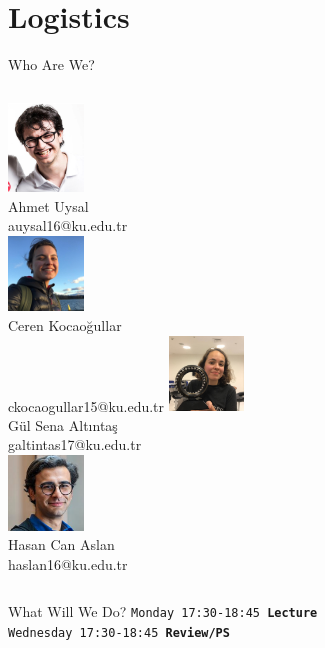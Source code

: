 	\section{Logistics}
		\begin{frame}{Who Are We?}
			\begin{columns}
				\column{5cm}
				\centering 
					\includegraphics[width=2.0cm]{images/ahmet.png}\\
					Ahmet Uysal\\
					auysal16@ku.edu.tr\\
					\pause
					\includegraphics[width=2.0cm]{images/ceren.jpg}\\
					Ceren Kocaoğullar\\
					ckocaogullar15@ku.edu.tr
				\pause
				\column{5cm}
				\centering
					\includegraphics[width=2.0cm]{images/gulsena.jpg}\\
					Gül Sena Altıntaş\\
					galtintas17@ku.edu.tr\\
					\pause
					\includegraphics[width=2.0cm]{images/hasancan.jpg}\\
					Hasan Can Aslan\\
					haslan16@ku.edu.tr
			\end{columns}
		\end{frame}

		\begin{frame}{What Will We Do?}
			\LARGE
			\texttt{Monday 17:30-18:45 \textbf{Lecture}}\\
			\pause
			\texttt{Wednesday 17:30-18:45 \textbf{Review/PS}}\\
			\pause  
			\pause
			\vspace{4mm}
			\centering
		\end{frame}

